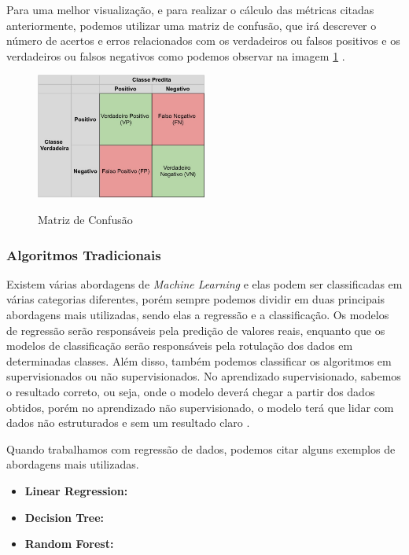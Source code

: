Para uma melhor visualização, e para realizar o cálculo das métricas citadas anteriormente, podemos utilizar uma matriz de confusão, que irá descrever o número de acertos e erros relacionados com os verdadeiros ou falsos positivos e os verdadeiros ou falsos negativos como podemos observar na imagem \ref{fig:confusionMatrix} \cite{machineLearningTensorFlow}.

\begin{figure}[!htb]
	\centering
	\caption{Matriz de Confusão}
	\includegraphics[width=0.50\textwidth]{img/confusionMatrix.jpg}
	\label{fig:confusionMatrix}
\end{figure}

\subsubsection{Algoritmos Tradicionais}

Existem várias abordagens de \emph{Machine Learning} e elas podem ser classificadas em várias categorias diferentes, porém sempre podemos dividir em duas principais abordagens mais utilizadas, sendo elas a regressão e a classificação. Os modelos de regressão serão responsáveis pela predição de valores reais, enquanto que os modelos de classificação serão responsáveis pela rotulação dos dados em determinadas classes. Além disso, também podemos classificar os algoritmos em supervisionados ou não supervisionados. No aprendizado supervisionado, sabemos o resultado correto, ou seja, onde o modelo deverá chegar a partir dos dados obtidos, porém no aprendizado não supervisionado, o modelo terá que lidar com dados não estruturados e sem um resultado claro \cite{machineLearningPython}.

Quando trabalhamos com regressão de dados, podemos citar alguns exemplos de abordagens mais utilizadas.
\begin{itemize}
    \item \textbf{Linear Regression:}
    \item \textbf{Decision Tree:}
    \item \textbf{Random Forest:}
\end{itemize}


